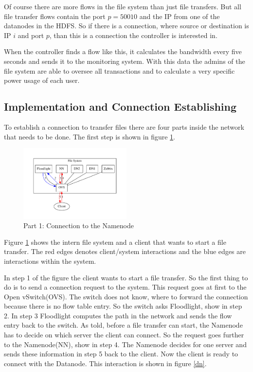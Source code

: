  Of course there are more flows in the file system than just file transfers. But all file transfer flows contain the port $p=50010$ and the IP from one of the datanodes in the HDFS. So if there is a connection, where source or destination is IP $i$ and port $p$, than this is a connection the controller is interested in.
 
 When the controller finds a flow like this, it calculates the bandwidth every five seconds and sends it to the monitoring system. With this data the admins of the file system are able to oversee all transactions and to calculate a very specific power usage of each user. 
 
 \subsection{Implementation and Connection Establishing}               

To establish a connection to transfer files there are four parts inside the network that needs to be done. The first step is shown in figure \ref{nn}.
 
\begin{figure}[ht]
\centering
\includegraphics[width=0.5\textwidth]{img/connectionToNamenode} 
\caption{Part 1: Connection to the Namenode}
\label{nn}
\end{figure}

Figure \ref{nn} shows the intern file system and a client that wants to start a file transfer. The red edges denotes client/system interactions and the blue edges are interactions within the system.

In step 1 of the figure the client wants to start a file transfer. So the first thing to do is to send a connection request to the system. This request goes at first to the Open vSwitch(OVS). The switch does not know, where to forward the connection because there is no flow table entry. So the switch asks Floodlight, show in step 2. In step 3 Floodlight computes the path in the network and sends the flow entry back to the switch. As told, before a file transfer can start, the Namenode has to decide on which server the client can connect. So the request goes further to the Namenode(NN), show in step 4. The Namenode decides for one server and sends these information in step 5 back to the client. Now the client is ready to connect with the Datanode. This interaction is shown in figure \ref{dn}.

